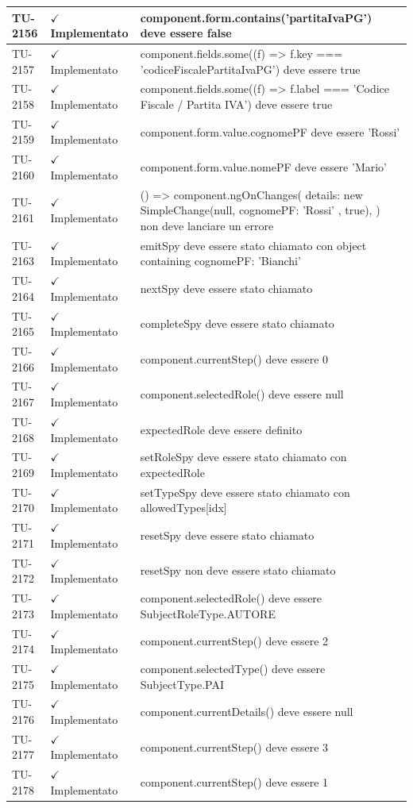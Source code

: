 ﻿\documentclass[a4paper,12pt]{article}
\newcommand{\ok}{\textcolor{green!60!black}{$\checkmark$ Implementato}}
\begin{document}
\begin{longtable}{|p{2cm}|p{3.5cm}|p{9.5cm}|}
\hline
TU-2156 & \ok & component.form.contains('partitaIvaPG') deve essere false \\
\hline
TU-2157 & \ok & component.fields.some((f) => f.key === 'codiceFiscalePartitaIvaPG') deve essere true \\
\hline
TU-2158 & \ok & component.fields.some((f) => f.label === 'Codice Fiscale / Partita IVA') deve essere true \\
\hline
TU-2159 & \ok & component.form.value.cognomePF deve essere 'Rossi' \\
\hline
TU-2160 & \ok & component.form.value.nomePF deve essere 'Mario' \\
\hline
TU-2161 & \ok & () => { component.ngOnChanges({ details: new SimpleChange(null, { cognomePF: 'Rossi' }, true), }) } non deve lanciare un errore \\
\hline
TU-2163 & \ok & emitSpy deve essere stato chiamato con object containing { cognomePF: 'Bianchi' } \\
\hline
TU-2164 & \ok & nextSpy deve essere stato chiamato \\
\hline
TU-2165 & \ok & completeSpy deve essere stato chiamato \\
\hline
TU-2166 & \ok & component.currentStep() deve essere 0 \\
\hline
TU-2167 & \ok & component.selectedRole() deve essere null \\
\hline
TU-2168 & \ok & expectedRole deve essere definito \\
\hline
TU-2169 & \ok & setRoleSpy deve essere stato chiamato con expectedRole \\
\hline
TU-2170 & \ok & setTypeSpy deve essere stato chiamato con allowedTypes[idx] \\
\hline
TU-2171 & \ok & resetSpy deve essere stato chiamato \\
\hline
TU-2172 & \ok & resetSpy non deve essere stato chiamato \\
\hline
TU-2173 & \ok & component.selectedRole() deve essere SubjectRoleType.AUTORE \\
\hline
TU-2174 & \ok & component.currentStep() deve essere 2 \\
\hline
TU-2175 & \ok & component.selectedType() deve essere SubjectType.PAI \\
\hline
TU-2176 & \ok & component.currentDetails() deve essere null \\
\hline
TU-2177 & \ok & component.currentStep() deve essere 3 \\
\hline
TU-2178 & \ok & component.currentStep() deve essere 1 \\

\end{longtable}
\end{document}
